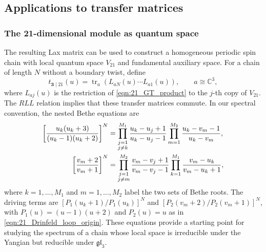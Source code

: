 \documentclass[12pt,reqno]{amsart}
\newcommand{\C}{{\mathbb C}}
\numberwithin{equation}{section}
\begin{document}
\subsection{Applications to transfer matrices}
\label{subsec:transfer_applications}
\subsubsection{The 21-dimensional module as quantum space}
The resulting Lax matrix can be used to construct a homogeneous
periodic spin chain with local quantum space $V_{21}$ and fundamental
auxiliary space. For a chain of length $N$ without a boundary twist, define
\begin{equation}
    t_{\mathbf3\mid21}(u)
    =\operatorname{tr}_a\!\left(
       L_{aN}(u)\cdots L_{a1}(u)\right),
    \qquad a\cong\C^3,
    \label{eqn:21_quantum_transfer}
\end{equation}
where $L_{aj}(u)$ is the restriction of
\eqref{eqn:21_GT_product} to the $j$-th copy of $V_{21}$.
The $RLL$ relation implies that these transfer matrices commute.
In our spectral convention, the nested Bethe equations are
\cite[Section~2.6]{Arnaudon2005}
\begin{align}
    \left[\frac{u_k(u_k+3)}{(u_k-1)(u_k+2)}\right]^N
    &=\prod_{\substack{j=1\\j\neq k}}^{M_1}
      \frac{u_k-u_j+1}{u_k-u_j-1}
      \prod_{m=1}^{M_2}\frac{u_k-v_m-1}{u_k-v_m},
      \notag\\
    \left[\frac{v_m+2}{v_m+1}\right]^N
    &=\prod_{\substack{j=1\\j\neq m}}^{M_2}
      \frac{v_m-v_j+1}{v_m-v_j-1}
      \prod_{k=1}^{M_1}\frac{v_m-u_k}{v_m-u_k+1},
    \label{eqn:R21_BAE}
\end{align}
where $k=1,\ldots,M_1$ and $m=1,\ldots,M_2$ label the two sets
of Bethe roots. The driving terms are
$[P_1(u_k+1)/P_1(u_k)]^N$ and
$[P_2(v_m+2)/P_2(v_m+1)]^N$, with
$P_1(u)=(u-1)(u+2)$ and $P_2(u)=u$ as in
\eqref{eqn:21_Drinfeld_loop_origin}. These equations provide a
starting point for studying the spectrum of a chain whose local
space is irreducible under the Yangian but reducible under
$\mathfrak{gl}_3$.
\end{document}
